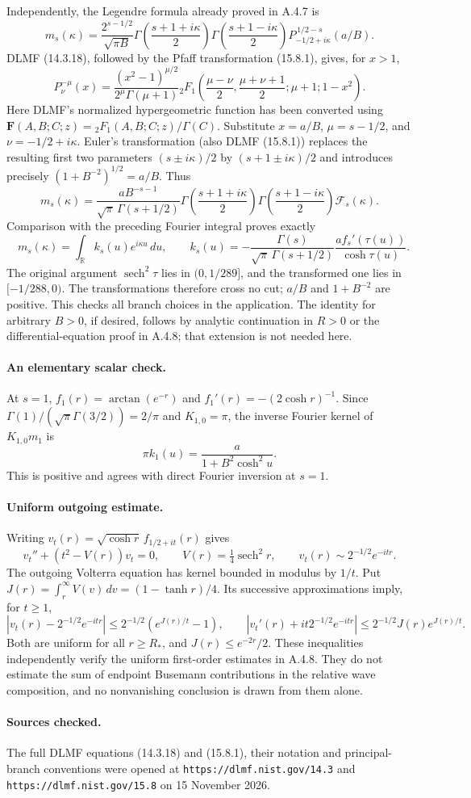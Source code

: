 Independently, the Legendre formula already proved in A.4.7 is
\[
 m_s(\kappa)=\frac{2^{s-1/2}}{\sqrt{\pi B}}
 \Gamma\!\left(\frac{s+1+i\kappa}2\right)
 \Gamma\!\left(\frac{s+1-i\kappa}2\right)
 P_{-1/2+i\kappa}^{\,1/2-s}(a/B).
\]
DLMF (14.3.18), followed by the Pfaff transformation (15.8.1), gives,
for $x>1$,
\[
 P_\nu^{-\mu}(x)=
 \frac{(x^2-1)^{\mu/2}}{2^\mu\Gamma(\mu+1)}
 {}_2F_1\!\left(\frac{\mu-\nu}2,
                  \frac{\mu+\nu+1}2;\mu+1;1-x^2\right).
\]
Here DLMF's normalized hypergeometric function has been converted
using $\mathbf F(A,B;C;z)={}_2F_1(A,B;C;z)/\Gamma(C)$.
Substitute $x=a/B$, $\mu=s-1/2$, and $\nu=-1/2+i\kappa$.
Euler's transformation (also DLMF (15.8.1)) replaces the resulting
first two parameters $(s\pm i\kappa)/2$ by
$(s+1\pm i\kappa)/2$ and introduces precisely
$(1+B^{-2})^{1/2}=a/B$.  Thus
\[
 m_s(\kappa)=
 \frac{a B^{-s-1}}
      {\sqrt\pi\,\Gamma(s+1/2)}
 \Gamma\!\left(\frac{s+1+i\kappa}2\right)
 \Gamma\!\left(\frac{s+1-i\kappa}2\right)
 \mathcal F_s(\kappa).
\]
Comparison with the preceding Fourier integral proves exactly
\[
 \boxed{\quad
 m_s(\kappa)=\int_{\mathbb R}k_s(u)e^{i\kappa u}\,du,
 \qquad
 k_s(u)=-\frac{\Gamma(s)}{\sqrt\pi\,\Gamma(s+1/2)}
       \frac{a f_s'(\tau(u))}{\cosh\tau(u)}.
 \quad}
\]
The original argument $\operatorname{sech}^2\tau$ lies in $(0,1/289]$,
and the transformed one lies in $[-1/288,0)$.
The transformations therefore cross no cut; $a/B$ and
$1+B^{-2}$ are positive.  This checks all branch choices in the
application.  The identity for arbitrary $B>0$, if desired, follows
by analytic continuation in $R>0$ or the differential-equation proof
in A.4.8; that extension is not needed here.

\paragraph{An elementary scalar check.}
At $s=1$,
$f_1(r)=\arctan(e^{-r})$ and $f_1'(r)=-(2\cosh r)^{-1}$.
Since $\Gamma(1)/(\sqrt\pi\Gamma(3/2))=2/\pi$ and
$K_{1,0}=\pi$, the inverse Fourier kernel of $K_{1,0}m_1$ is
\[
 \pi k_1(u)=\frac{a}{1+B^2\cosh^2u}.
\]
This is positive and agrees with direct Fourier inversion at $s=1$.

\paragraph{Uniform outgoing estimate.}
Writing $v_t(r)=\sqrt{\cosh r}\,f_{1/2+it}(r)$ gives
\[
 v_t''+(t^2-V(r))v_t=0,\qquad
 V(r)=\tfrac14\operatorname{sech}^2r,\qquad
 v_t(r)\sim2^{-1/2}e^{-itr}.
\]
The outgoing Volterra equation has kernel bounded in modulus by
$1/t$.  Put $J(r)=\int_r^\infty V(v)\,dv=(1-\tanh r)/4$.
Its successive approximations imply, for $t\geq1$,
\[
 \left|v_t(r)-2^{-1/2}e^{-itr}\right|
 \leq2^{-1/2}(e^{J(r)/t}-1),\qquad
 \left|v_t'(r)+it2^{-1/2}e^{-itr}\right|
 \leq2^{-1/2}J(r)e^{J(r)/t}.
\]
Both are uniform for all $r\geq R_*$, and
$J(r)\leq e^{-2r}/2$.  These inequalities independently verify
the uniform first-order estimates in A.4.8.  They do not estimate
the sum of endpoint Busemann contributions in the relative wave
composition, and no nonvanishing conclusion is drawn from them alone.

\paragraph{Sources checked.}
The full DLMF equations (14.3.18) and (15.8.1), their notation and
principal-branch conventions were opened at
\texttt{https://dlmf.nist.gov/14.3} and
\texttt{https://dlmf.nist.gov/15.8} on 15 November 2026.
